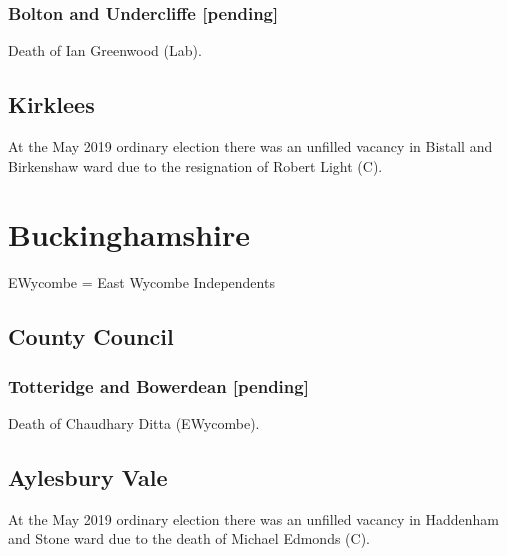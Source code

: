 \documentclass[a4paper,openany]{book}
\begin{document}
\begin{resultsiii}
\subsubsection*{Bolton and Undercliffe \hspace*{\fill}\nolinebreak[1]%
	\enspace\hspace*{\fill}
	[pending]}


Death of Ian Greenwood (Lab).

\subsection*{Kirklees}

At the May 2019 ordinary election there was an unfilled vacancy in Bistall and Birkenshaw ward due to the resignation of Robert Light (C).

\section{Buckinghamshire}

EWycombe = East Wycombe Independents

\subsection*{County Council}

\subsubsection*{Totteridge and Bowerdean \hspace*{\fill}\nolinebreak[1]%
	\enspace\hspace*{\fill}
	[pending]}


Death of Chaudhary Ditta (EWycombe).

\subsection*{Aylesbury Vale}

At the May 2019 ordinary election there was an unfilled vacancy in Haddenham and Stone ward due to the death of Michael Edmonds (C).


\end{resultsiii}
\end{document}
